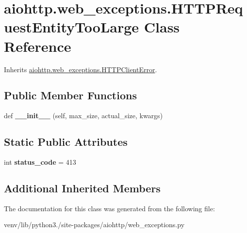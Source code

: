 \hypertarget{classaiohttp_1_1web__exceptions_1_1_h_t_t_p_request_entity_too_large}{}\section{aiohttp.\+web\+\_\+exceptions.\+H\+T\+T\+P\+Request\+Entity\+Too\+Large Class Reference}
\label{classaiohttp_1_1web__exceptions_1_1_h_t_t_p_request_entity_too_large}


Inherits \hyperlink{classaiohttp_1_1web__exceptions_1_1_h_t_t_p_client_error}{aiohttp.\+web\+\_\+exceptions.\+H\+T\+T\+P\+Client\+Error}.

\subsection*{Public Member Functions}
\begin{DoxyCompactItemize}
\item 
\mbox{\label{classaiohttp_1_1web__exceptions_1_1_h_t_t_p_request_entity_too_large_a2f86b29c1916751a3d0806d28bcf900e}} 
def {\bfseries \+\_\+\+\_\+init\+\_\+\+\_\+} (self, max\+\_\+size, actual\+\_\+size, kwargs)
\end{DoxyCompactItemize}
\subsection*{Static Public Attributes}
\begin{DoxyCompactItemize}
\item 
\mbox{\label{classaiohttp_1_1web__exceptions_1_1_h_t_t_p_request_entity_too_large_a5642e985832e5d18749cd37d56e4d5a1}} 
int {\bfseries status\+\_\+code} = 413
\end{DoxyCompactItemize}
\subsection*{Additional Inherited Members}


The documentation for this class was generated from the following file\+:\begin{DoxyCompactItemize}
\item 
venv/lib/python3./site-\/packages/aiohttp/web\+\_\+exceptions.\+py\end{DoxyCompactItemize}
